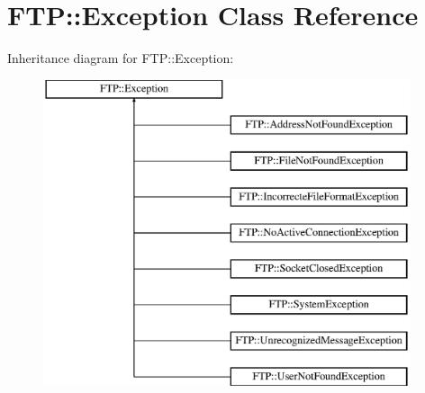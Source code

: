 \hypertarget{class_f_t_p_1_1_exception}{\section{F\-T\-P\-:\-:Exception Class Reference}
\label{class_f_t_p_1_1_exception}
}
Inheritance diagram for F\-T\-P\-:\-:Exception\-:\begin{figure}[H]
\begin{center}
\leavevmode
\includegraphics[height=9.000000cm]{class_f_t_p_1_1_exception}
\end{center}
\end{figure}
